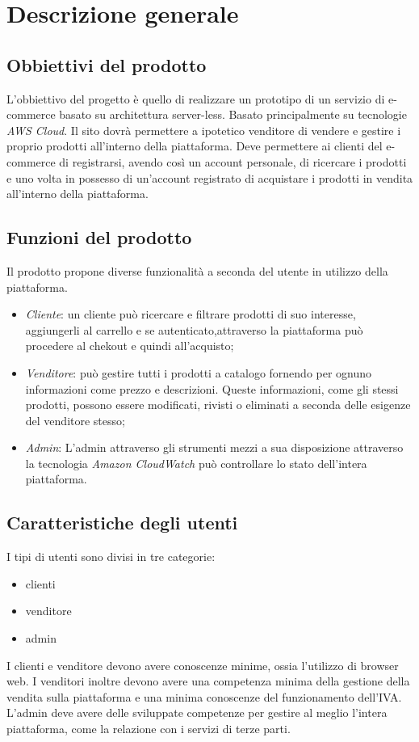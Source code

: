 \section{Descrizione generale}
\subsection{Obbiettivi del prodotto}
L'obbiettivo del progetto è quello di realizzare un prototipo di un servizio di e-commerce basato su architettura server-less. Basato principalmente su tecnologie \textit{AWS Cloud}. Il sito dovrà permettere a ipotetico venditore di vendere e gestire i proprio prodotti all'interno della piattaforma. Deve permettere ai clienti del e-commerce di registrarsi, avendo così un account personale, di ricercare i prodotti e uno volta in possesso di un'account registrato di acquistare i prodotti in vendita all'interno della piattaforma.
\subsection{Funzioni del prodotto}
Il prodotto propone diverse funzionalità a seconda del utente in utilizzo della piattaforma.
\begin{itemize}
    \item \textit{Cliente}: un cliente può ricercare e filtrare prodotti di suo interesse, aggiungerli al carrello e se autenticato,attraverso la piattaforma %
    può procedere al chekout e quindi all'acquisto;
    \item \textit{Venditore}: può gestire tutti i prodotti a catalogo fornendo per ognuno informazioni come prezzo e descrizioni. Queste informazioni, come gli stessi prodotti, possono essere modificati, rivisti o eliminati a seconda delle esigenze del venditore stesso;
    \item \textit{Admin}: L'admin attraverso gli strumenti mezzi a sua disposizione attraverso la tecnologia \textit{Amazon CloudWatch} può controllare lo stato dell'intera piattaforma.
\end{itemize}
\subsection{Caratteristiche degli utenti}
I tipi di utenti sono divisi in tre categorie:
\begin{itemize}
    \item clienti
    \item venditore
    \item admin
\end{itemize}
I clienti e venditore devono avere conoscenze minime, ossia l'utilizzo di browser  web. I venditori inoltre devono avere una competenza minima della gestione della vendita sulla piattaforma e una minima conoscenze del funzionamento dell'IVA. L'admin deve avere delle sviluppate competenze per gestire al meglio l'intera piattaforma, come la relazione con i servizi di terze parti.
